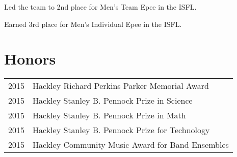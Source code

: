 \documentclass[letterpaper]{deedy-resume} %
\begin{document}
\begin{minipage}[t]{0.58\textwidth}
\sectionspace %






\begin{tightitemize}
\item Led the team to 2nd place for Men's Team Epee in the ISFL.
\item Earned 3rd place for Men's Individual Epee in the ISFL.
\end{tightitemize}


\section{Honors} 

\begin{tabular}{rl}
2015	 & Hackley Richard Perkins Parker Memorial Award \\
2015	 & Hackley Stanley B. Pennock Prize in Science \\
2015	 & Hackley Stanley B. Pennock Prize in Math \\
2015 	 & Hackley Stanley B. Pennock Prize for Technology \\
2015 	 & Hackley Community Music Award for Band Ensembles \\
\end{tabular}

\sectionspace %



\end{minipage}
\end{document}
